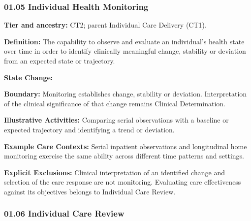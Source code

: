 \label{rad:business:261}



\label{rad:business:263}
\subsubsection*{01.05 Individual Health Monitoring}
\label{rad:business:265}

\textbf{Tier and ancestry:} CT2; parent Individual Care Delivery (CT1).

\label{rad:business:267}

\textbf{Definition:} The capability to observe and evaluate an individual's health state over time in order to identify clinically meaningful change, stability or deviation from an expected state or trajectory.

\label{rad:business:271}

\textbf{State Change:} \texttt{}

\label{rad:business:273}

\textbf{Boundary:} Monitoring establishes change, stability or deviation. Interpretation of the clinical significance of that change remains Clinical Determination.

\label{rad:business:277}

\textbf{Illustrative Activities:} Comparing serial observations with a baseline or expected trajectory and identifying a trend or deviation.

\label{rad:business:280}

\textbf{Example Care Contexts:} Serial inpatient observations and longitudinal home monitoring exercise the same ability across different time patterns and settings.

\label{rad:business:283}

\textbf{Explicit Exclusions:} Clinical interpretation of an identified change and selection of the care response are not monitoring. Evaluating care effectiveness against its objectives belongs to Individual Care Review.

\label{rad:business:287}



\label{rad:business:289}
\subsubsection*{01.06 Individual Care Review}
\label{rad:business:291}

